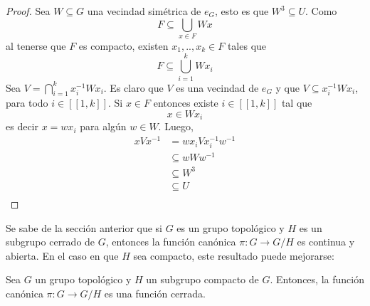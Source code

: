\documentclass[12pt]{report}
\theoremstyle{largebreak}
\newcommand\cf[3]{\ensuremath{#1:#2\rightarrow#3}}
\newcommand{\natint}[1]{\left[\!\left[#1\right]\!\right]}
\begin{document}
    \begin{proof}
        Sea $W\subseteq G$ una vecindad simétrica de $e_G$, esto es que $W^3\subseteq U$. Como
        \begin{equation*}
            F\subseteq\bigcup_{ x\in F}Wx
        \end{equation*}
        al tenerse que $F$ es compacto, existen $x_1,..,x_k\in F$ tales que
        \begin{equation*}
            F\subseteq \bigcup_{ i=1}^k Wx_i
        \end{equation*}
        Sea $V=\bigcap_{ i=1}^kx_i^{-1}Wx_i$. Es claro que $V$ es una vecindad de $e_G$ y que $V\subseteq x_i^{-1}Wx_i$, para todo $i\in\natint{1,k}$. Si $x\in F$ entonces existe $i\in\natint{1,k}$ tal que
        \begin{equation*}
            x\in Wx_i
        \end{equation*}
        es decir $x=wx_i$ para algún $w\in W$. Luego,
        \begin{equation*}
            \begin{split}
                xVx^{-1}&=wx_iVx_i^{-1}w^{-1}\\
                &\subseteq wWw^{-1}\\
                &\subseteq W^3\\
                &\subseteq U\\
            \end{split}
        \end{equation*}
    \end{proof}

    Se sabe de la sección anterior que si $G$ es un grupo topológico y $H$ es un subgrupo cerrado de $G$, entonces la función canónica $\cf{\pi}{G}{G/H}$ es continua y abierta. En el caso en que $H$ sea compacto, este resultado puede mejorarse:

    \begin{theor}
        Sea $G$ un grupo topológico y $H$ un subgrupo compacto de $G$. Entonces, la función canónica $\cf{\pi}{G}{G/H}$ es una función cerrada.
    \end{theor}
\end{document}
